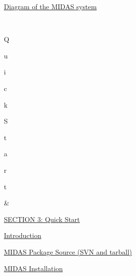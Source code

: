 \begin{TabularC}{2}
\begin{TabularC}{2}
\begin{DoxyItemize}
\item \hyperlink{I_Midas_system_picture}{Diagram of the MIDAS system} 
\end{DoxyItemize}\\
 \par
\par
\par
Q\par
u\par
i\par
c\par
k\par
 \par
S\par
t\par
a\par
r\par
t\par
   &\label{O_Contents_Page_Quickstart_section_index}
\hypertarget{O_Contents_Page_Quickstart_section_index}{}
 \par
 \hyperlink{Quickstart}{SECTION 3: Quick Start} 
\begin{DoxyItemize}
\item \hyperlink{Quickstart_Q_QuickStartIntro}{Introduction} 
\item \hyperlink{Quickstart_Q_SVN}{MIDAS Package Source (SVN and tarball)} 
\item \hyperlink{Quickstart_Q_Quickstart_Installation}{MIDAS Installation} \par
 

\end{DoxyItemize}
\end{TabularC}
\end{TabularC}

